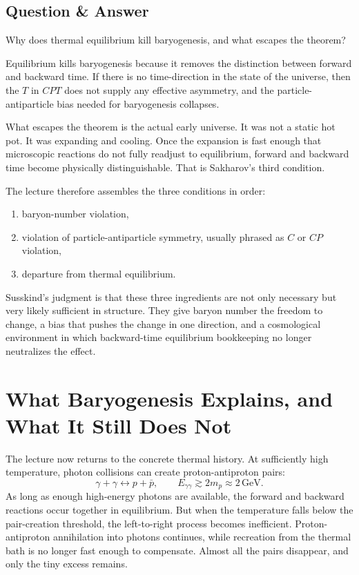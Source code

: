 \subsection{Question \& Answer}

Why does thermal equilibrium kill baryogenesis, and what escapes the theorem?

Equilibrium kills baryogenesis because it removes the distinction between forward and backward time. If there is no time-direction in the state of the universe, then the \(T\) in \(CPT\) does not supply any effective asymmetry, and the particle-antiparticle bias needed for baryogenesis collapses.

What escapes the theorem is the actual early universe. It was not a static hot pot. It was expanding and cooling. Once the expansion is fast enough that microscopic reactions do not fully readjust to equilibrium, forward and backward time become physically distinguishable. That is Sakharov's third condition.

The lecture therefore assembles the three conditions in order:
\begin{enumerate}
\item baryon-number violation,
\item violation of particle-antiparticle symmetry, usually phrased as \(C\) or \(CP\) violation,
\item departure from thermal equilibrium.
\end{enumerate}
Susskind's judgment is that these three ingredients are not only necessary but very likely sufficient in structure. They give baryon number the freedom to change, a bias that pushes the change in one direction, and a cosmological environment in which backward-time equilibrium bookkeeping no longer neutralizes the effect.

\section{What Baryogenesis Explains, and What It Still Does Not}

The lecture now returns to the concrete thermal history. At sufficiently high temperature, photon collisions can create proton-antiproton pairs:
\begin{equation}
\gamma+\gamma \leftrightarrow p+\bar p,
\qquad
E_{\gamma\gamma}\gtrsim 2m_p \approx 2\,\mathrm{GeV}.
\end{equation}
As long as enough high-energy photons are available, the forward and backward reactions occur together in equilibrium. But when the temperature falls below the pair-creation threshold, the left-to-right process becomes inefficient. Proton-antiproton annihilation into photons continues, while recreation from the thermal bath is no longer fast enough to compensate. Almost all the pairs disappear, and only the tiny excess remains.

